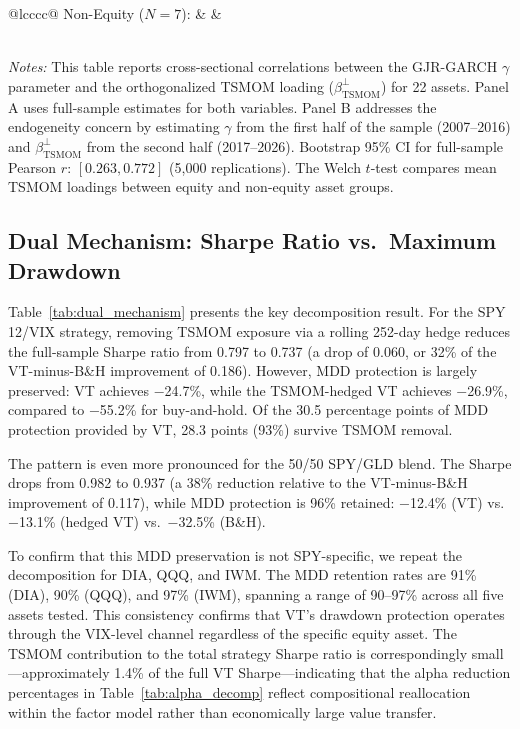 \begin{table}[H]
\begin{threeparttable}
\begin{tabular}{@{}lcccc@{}}
Non-Equity ($N = 7$): &  &  \\
 \\
\bottomrule
\end{tabular}
\begin{tablenotes}
\small
\item \textit{Notes:} This table reports cross-sectional correlations between the GJR-GARCH $\gamma$ parameter and the orthogonalized TSMOM loading ($\beta_{\text{TSMOM}}^{\perp}$) for 22 assets. Panel A uses full-sample estimates for both variables. Panel B addresses the endogeneity concern by estimating $\gamma$ from the first half of the sample (2007--2016) and $\beta_{\text{TSMOM}}^{\perp}$ from the second half (2017--2026). Bootstrap 95\% CI for full-sample Pearson $r$: $[0.263, 0.772]$ (5,000 replications). The Welch $t$-test compares mean TSMOM loadings between equity and non-equity asset groups.
\end{tablenotes}
\end{threeparttable}
\end{table}


\subsection{Dual Mechanism: Sharpe Ratio vs.\ Maximum Drawdown}

Table~\ref{tab:dual_mechanism} presents the key decomposition result. For the SPY 12/VIX strategy, removing TSMOM exposure via a rolling 252-day hedge reduces the full-sample Sharpe ratio from 0.797 to 0.737 (a drop of 0.060, or 32\% of the VT-minus-B\&H improvement of 0.186). However, MDD protection is largely preserved: VT achieves $-$24.7\%, while the TSMOM-hedged VT achieves $-$26.9\%, compared to $-$55.2\% for buy-and-hold. Of the 30.5 percentage points of MDD protection provided by VT, 28.3 points (93\%) survive TSMOM removal.

The pattern is even more pronounced for the 50/50 SPY/GLD blend. The Sharpe drops from 0.982 to 0.937 (a 38\% reduction relative to the VT-minus-B\&H improvement of 0.117), while MDD protection is 96\% retained: $-$12.4\% (VT) vs.\ $-$13.1\% (hedged VT) vs.\ $-$32.5\% (B\&H).

To confirm that this MDD preservation is not SPY-specific, we repeat the decomposition for DIA, QQQ, and IWM. The MDD retention rates are 91\% (DIA), 90\% (QQQ), and 97\% (IWM), spanning a range of 90--97\% across all five assets tested. This consistency confirms that VT's drawdown protection operates through the VIX-level channel regardless of the specific equity asset. The TSMOM contribution to the total strategy Sharpe ratio is correspondingly small---approximately 1.4\% of the full VT Sharpe---indicating that the alpha reduction percentages in Table~\ref{tab:alpha_decomp} reflect compositional reallocation within the factor model rather than economically large value transfer.

